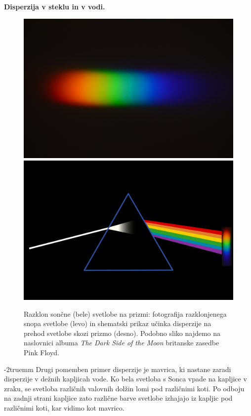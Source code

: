 \begin{example}{\bf Disperzija v steklu in v vodi.}
\begin{figure}[ht]
\centering
\includegraphics[width=7truecm]{slike/09_prizma.jpg}\hfill
\includegraphics[width=7truecm]{slike/09_prizma_disp.png}
\caption{Razklon sončne (bele) svetlobe na prizmi: fotografija razklonjenega
snopa svetlobe (levo) in shematski prikaz učinka disperzije na prehod svetlobe
skozi prizmo (desno). Podobno sliko najdemo na naslovnici albuma 
{\it The Dark Side of the Moon} britanske zasedbe Pink Floyd.}
\label{fig:09_prizma}
\end{figure}
\vglue-2truemm
Drugi pomemben primer disperzije je mavrica, ki nastane zaradi
disperzije v dežnih kapljicah vode. Ko bela svetloba s Sonca vpade
na kapljice v zraku, se svetloba različnih valovnih dolžin 
lomi pod različnimi koti. Po odboju na zadnji strani kapljice 
zato različne barve svetlobe izhajajo iz kapljic pod različnimi koti, 
kar vidimo kot mavrico.
\begin{figure}[ht]

\end{figure}
\end{example}

